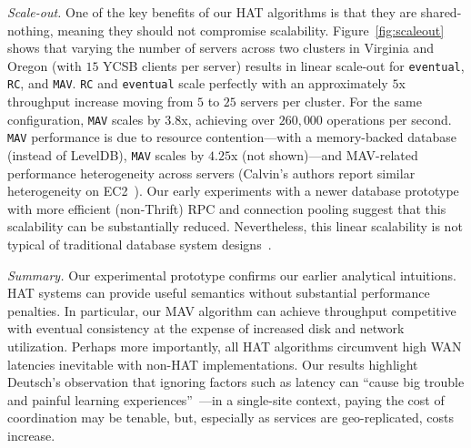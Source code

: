 \vspace{.5em}\noindent\textit{Scale-out.} One of the key benefits of
our HAT algorithms is that they are shared-nothing, meaning they
should not compromise scalability. Figure~\ref{fig:scaleout} shows
that varying the number of servers across two clusters in Virginia and
Oregon (with $15$ YCSB clients per server) results in linear scale-out
for \texttt{eventual}, \texttt{RC}, and \texttt{MAV}. \texttt{RC} and
\texttt{eventual} scale perfectly with an approximately $5$x
throughput increase moving from $5$ to $25$ servers per cluster. For
the same configuration, \texttt{MAV} scales by $3.8$x, achieving over
$260,000$ operations per second. \texttt{MAV} performance is due to
resource contention---with a memory-backed database (instead of
LevelDB), \texttt{MAV} scales by $4.25$x (not shown)---and MAV-related
performance heterogeneity across servers (Calvin's authors report
similar heterogeneity on EC2~\cite{calvin}). Our early experiments
with a newer database prototype with more efficient (non-Thrift) RPC
and connection pooling suggest that this scalability can be
substantially reduced. Nevertheless, this linear scalability is not
typical of traditional database system designs~\cite{gray-isolation}.

\vspace{.5em}\noindent\textit{Summary.} Our experimental prototype
confirms our earlier analytical intuitions. HAT systems can provide
useful semantics without substantial performance penalties. In
particular, our MAV algorithm can achieve throughput competitive with
eventual consistency at the expense of increased disk and network
utilization. Perhaps more importantly, all HAT algorithms circumvent
high WAN latencies inevitable with non-HAT implementations. Our results
highlight Deutsch's observation that ignoring factors such as latency
can ``cause big trouble and painful learning
experiences''~\cite{fallacies-deutsch}---in a single-site context,
paying the cost of coordination may be tenable, but, especially as
services are geo-replicated, costs increase.
